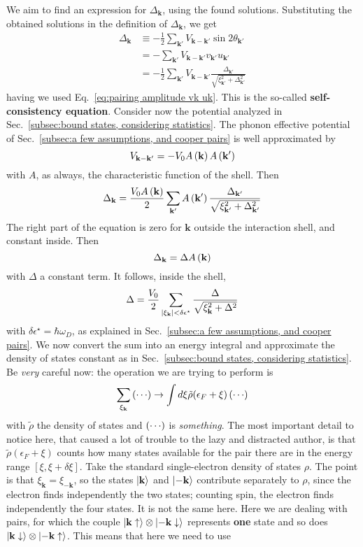 We aim to find an expression for $\Delta_\mathbf{k}$, using the found solutions. Substituting the obtained solutions in the definition of $\Delta_\mathbf{k}$, we get
\begin{align}
	\Delta_\mathbf{k} &\equiv - \frac{1}{2} 
	\sum_{\mathbf{k}'} V_{\mathbf{k}-\mathbf{k}'} \sin2\theta_{\mathbf{k}'} \nonumber \\
	&= - \sum_{\mathbf{k}'} V_{\mathbf{k}-\mathbf{k}'} v_{\mathbf{k}'} u_{\mathbf{k}'} \nonumber \\
	&= - \frac{1}{2} \sum_{\mathbf{k}'} V_{\mathbf{k}-\mathbf{k}'} \frac{\Delta_{\mathbf{k}'}}{\sqrt{\xi_{\mathbf{k}'}^2 + \Delta_{\mathbf{k}'}^2}} \label{eq:mean field self consistency equation}
\end{align}
having we used Eq.~\eqref{eq:pairing amplitude vk uk}. This is the so-called \textbf{self-consistency equation}. Consider now the potential analyzed in Sec.~\ref{subsec:bound states, considering statistics}. The phonon effective potential of Sec.~\ref{subsec:a few assumptions, and cooper pairs} is well approximated by
\[
	V_{\mathbf{k}-\mathbf{k}'} = - V_0 A\left({\mathbf{k}}\right) A\left({\mathbf{k}'}\right)
\]
with $A$, as always, the characteristic function of the shell. Then
\[
	\Delta_\mathbf{k} = \frac{V_0 A\left({\mathbf{k}}\right)}{2} \sum_{\mathbf{k}'} A\left({\mathbf{k}'}\right) \frac{\Delta_{\mathbf{k}'}}{\sqrt{\xi_{\mathbf{k}'}^2 + \Delta_{\mathbf{k}'}^2}}
\]
The right part of the equation is zero for $\mathbf{k}$ outside the interaction shell, and constant inside. Then
\[
	\Delta_\mathbf{k} = \Delta A\left({\mathbf{k}}\right)
\]
with $\Delta$ a constant term. It follows, inside the shell,
\[
	\Delta = \frac{V_0}{2} \sum_{\abs{\xi_\mathbf{k}}<\delta\epsilon^\star} \frac{\Delta}{\sqrt{\xi_\mathbf{k}^2 + \Delta^2}}
\]
with $\delta\epsilon^\star = \hbar\omega_D$, as explained in Sec.~\ref{subsec:a few assumptions, and cooper pairs}. We now convert the sum into an energy integral and approximate the density of states constant as in Sec.~\ref{subsec:bound states, considering statistics}. Be \textit{very} careful now: the operation we are trying to perform is
\[
	\sum_{\xi_\mathbf{k}} \left({\cdots}\right) \to \int d\xi \tilde{\rho}(\epsilon_F+\xi) \left({\cdots}\right)
\]
with $\tilde{\rho}$ the density of states and $\left({\cdots}\right)$ is \textit{something}. The most important detail to notice here, that caused a lot of trouble to the lazy and distracted author, is that $\tilde{\rho}(\epsilon_F+\xi)$ counts how many states available for the pair there are in the energy range $[\xi,\xi+\delta\xi]$. Take the standard single-electron density of states $\rho$. The point is that $\xi_\mathbf{k} = \xi_{-\mathbf{k}}$, so the states $\ket{\mathbf{k}}$ and $\ket{-\mathbf{k}}$ contribute separately to $\rho$, since the electron finds independently the two states; counting spin, the electron finds independently the four states. It is not the same here. Here we are dealing with pairs, for which the couple $\ket{\mathbf{k}\uparrow} \otimes \ket{-\mathbf{k}\downarrow}$ represents \textbf{one} state and so does $\ket{\mathbf{k}\downarrow} \otimes \ket{-\mathbf{k}\uparrow}$. This means that here we need to use
